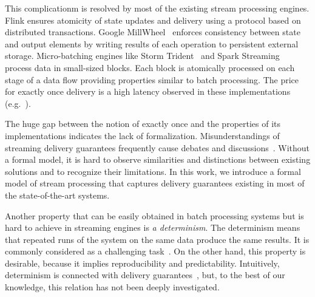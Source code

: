 This complicationm   is resolved  by most of the existing stream processing engines. 
Flink ensures atomicity of  state updates and   delivery using a protocol based on distributed transactions. 
Google MillWheel~\cite{Akidau:2013:MFS:2536222.2536229} enforces consistency between state and output elements by writing results of each operation to persistent external storage. 
Micro-batching engines like Storm Trident~\cite{apache:storm:trident} and Spark Streaming~\cite{Zaharia:2012:DSE:2342763.2342773} process data in small-sized blocks. 
Each block is atomically processed on each stage of a data flow  providing properties similar to batch processing. 
The price for exactly once delivery is a high latency  observed in these implementations (e.g.~\cite{7530084, 7474816}).


The huge gap between the notion of exactly once and the properties of its implementations indicates the lack of formalization. 
Misunderstandings of streaming delivery guarantees frequently cause debates and discussions~\cite{JerryPengStreamIO, PaperTrail}. Without a formal model, it is hard to observe similarities and distinctions between existing solutions and to recognize their limitations. In this work, we introduce a formal model of stream processing that captures delivery guarantees existing in most of the state-of-the-art systems.

Another property that can be easily obtained in batch processing systems but is hard to achieve in streaming engines is {\em a determinism}. 
The determinism means that repeated runs of the system on the same data produce the same results. It is commonly considered as a challenging task~\cite{Zacheilas:2017:MDS:3093742.3093921}. On the other hand, this property is desirable, because it implies reproducibility and predictability. Intuitively, determinism is connected with delivery guarantees~\cite{Stonebraker:2005:RRS:1107499.1107504}, but, to the best of our knowledge, this relation has not been deeply investigated. 


